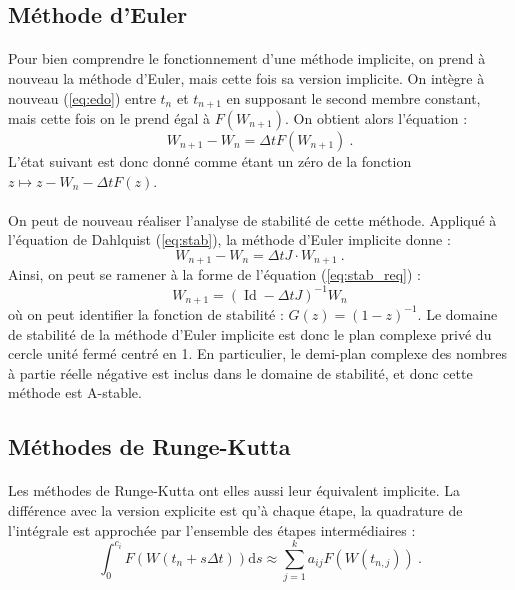   \subsection{Méthode d'Euler}

    \paragraph{}
    Pour bien comprendre le fonctionnement d'une méthode implicite, on prend à nouveau la méthode d'Euler, mais cette fois sa version implicite.
    On intègre à nouveau (\ref{eq:edo}) entre $t_n$ et $t_{n+1}$ en supposant le second membre constant, mais cette fois on le prend égal à $F\left(W_{n+1}\right)$.
    On obtient alors l'équation :
    \[W_{n+1} - W_n = \Delta tF\left(W_{n+1}\right)\ .\]
    L'état suivant est donc donné comme étant un zéro de la fonction $z\mapsto z - W_n - \Delta tF\left(z\right)$.

    \paragraph{}
    On peut de nouveau réaliser l'analyse de stabilité de cette méthode.
    Appliqué à l'équation de Dahlquist (\ref{eq:stab}), la méthode d'Euler implicite donne :
    \[W_{n+1} - W_n = \Delta tJ\cdot W_{n+1}\ .\]
    Ainsi, on peut se ramener à la forme de l'équation (\ref{eq:stab_req}) :
    \[W_{n+1} = \left(\operatorname{Id} - \Delta tJ\right)^{-1}W_n\]
    où on peut identifier la fonction de stabilité : $G\left(z\right) = \left(1-z\right)^{-1}$.
    Le domaine de stabilité de la méthode d'Euler implicite est donc le plan complexe privé du cercle unité fermé centré en 1.
    En particulier, le demi-plan complexe des nombres à partie réelle négative est inclus dans le domaine de stabilité, et donc cette méthode est A-stable.


  \subsection{Méthodes de Runge-Kutta}

    \paragraph{}
    Les méthodes de Runge-Kutta ont elles aussi leur équivalent implicite.
    La différence avec la version explicite est qu'à chaque étape, la quadrature de l'intégrale est approchée par l'ensemble des étapes intermédiaires :
    \[\int_0^{c_i}F\left(W\left(t_n + s\Delta t\right)\right)\mathrm{d}s \approx \sum_{j = 1}^ka_{ij}F\left(W\left(t_{n,j}\right)\right)\ .\]

